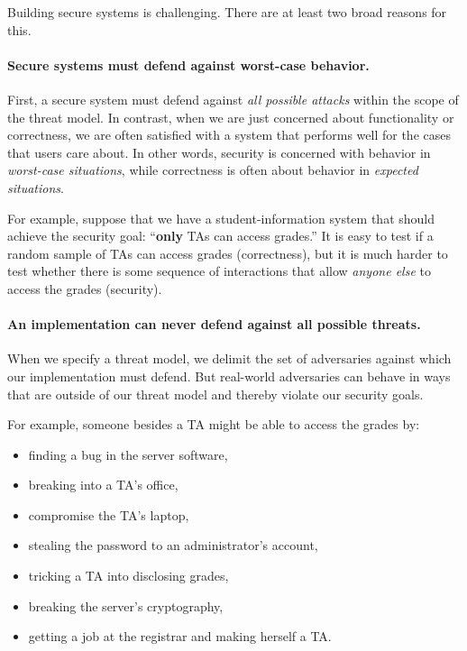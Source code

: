 Building secure systems is challenging.
There are at least two broad reasons for this.

\paragraph{Secure systems must defend against worst-case behavior.}
First, a secure system must defend against
\emph{all possible attacks} within the scope of 
the threat model.
In contrast, when we are just concerned about functionality or
correctness, we are often satisfied with a system 
that performs well for the cases that users care about.
In other words, security is concerned with behavior in
\emph{worst-case situations}, while correctness is often
about behavior in \emph{expected situations}.

For example, suppose that we have
a student-information system that should achieve the security
goal: ``\textbf{only} TAs can access grades.''
It is easy to test if a random sample of TAs can
access grades (correctness), but it is much harder to test whether
there is some sequence of interactions that allow
\textit{anyone else} to access the grades (security).

\paragraph{An implementation can never defend against all possible threats.}
When we specify a threat model, we delimit the set of adversaries 
against which our implementation must defend.
But real-world adversaries can behave in ways that are 
outside of our threat model and thereby violate our security goals.

For example, someone besides a TA might be able to
access the grades by:
\begin{itemize}
	\item finding a bug in the server software,
	\item breaking into a TA's office,
        \item compromise the TA's laptop,
	\item stealing the password to an administrator's account,
	\item tricking a TA into disclosing grades,
	\item breaking the server's cryptography,
	\item getting a job at the registrar and making herself a TA.
\end{itemize}

